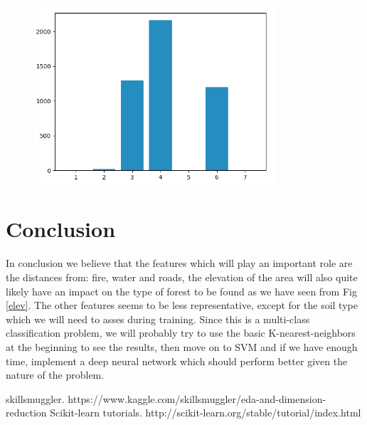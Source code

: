 \documentclass[a4paper, 11pt]{article}
\begin{document}
\begin{figure}[htb]
\centering
  \includegraphics[width=0.8\textwidth]{img/wild_area_4}
  \label{wild}
\end{figure}

\section*{Conclusion}
In conclusion we believe that the features which will play an important role are the distances from: fire, water and roads, the elevation of the area will also quite likely have an impact on the type of forest to be found as we have seen from Fig \ref{elev}. The other features seems to be less representative, except for the soil type which we will need to asses during training. Since this is a multi-class classification problem, we will probably try to use the basic K-nearest-neighbors at the beginning to see the results, then move on to SVM and if we have enough time, implement a deep neural network which should perform better given the nature of the problem.

\begin{thebibliography}{9}
 skillsmuggler. https://www.kaggle.com/skillsmuggler/eda-and-dimension-reduction
Scikit-learn tutorials. http://scikit-learn.org/stable/tutorial/index.html
\end{thebibliography}
\end{document}
